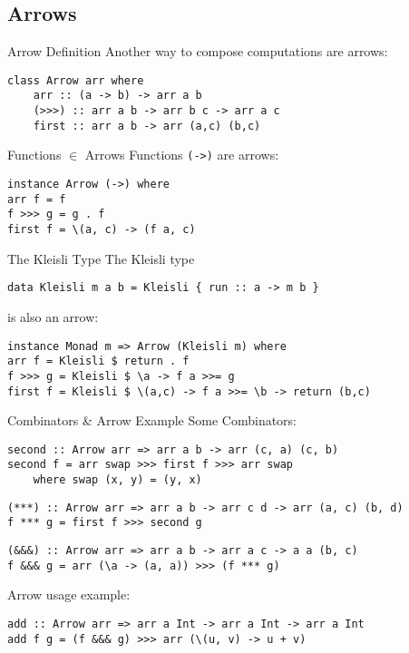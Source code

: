 \subsection{Arrows}
\begin{frame}[fragile]{Arrow Definition}
Another way to compose computations are arrows:
\begin{lstlisting}[frame=htrbl]
class Arrow arr where
	arr :: (a -> b) -> arr a b
	(>>>) :: arr a b -> arr b c -> arr a c
	first :: arr a b -> arr (a,c) (b,c)
\end{lstlisting}
\end{frame}

\begin{frame}[fragile]{Functions $\in$ Arrows}
Functions \lstinline{(->)} are arrows:
\begin{lstlisting}[frame=htrbl]
instance Arrow (->) where
arr f = f
f >>> g = g . f
first f = \(a, c) -> (f a, c)
\end{lstlisting}
\end{frame}

\begin{frame}[fragile]{The Kleisli Type}
The Kleisli type
\begin{lstlisting}[frame=htrbl]
data Kleisli m a b = Kleisli { run :: a -> m b }
\end{lstlisting}
is also an arrow:
\begin{lstlisting}[frame=htrbl]
instance Monad m => Arrow (Kleisli m) where
arr f = Kleisli $ return . f
f >>> g = Kleisli $ \a -> f a >>= g
first f = Kleisli $ \(a,c) -> f a >>= \b -> return (b,c)
\end{lstlisting}
\end{frame}

\begin{frame}[fragile]{Combinators \& Arrow Example}
Some Combinators:
\begin{lstlisting}[frame=htrbl]
second :: Arrow arr => arr a b -> arr (c, a) (c, b)
second f = arr swap >>> first f >>> arr swap
	where swap (x, y) = (y, x)
\end{lstlisting}
\begin{lstlisting}[frame=htrbl]
(***) :: Arrow arr => arr a b -> arr c d -> arr (a, c) (b, d)
f *** g = first f >>> second g
\end{lstlisting}
\begin{lstlisting}[frame=htrbl]
(&&&) :: Arrow arr => arr a b -> arr a c -> a a (b, c)
f &&& g = arr (\a -> (a, a)) >>> (f *** g)
\end{lstlisting}

Arrow usage example:
\begin{lstlisting}[frame=htrbl]
add :: Arrow arr => arr a Int -> arr a Int -> arr a Int
add f g = (f &&& g) >>> arr (\(u, v) -> u + v)
\end{lstlisting}
\end{frame}